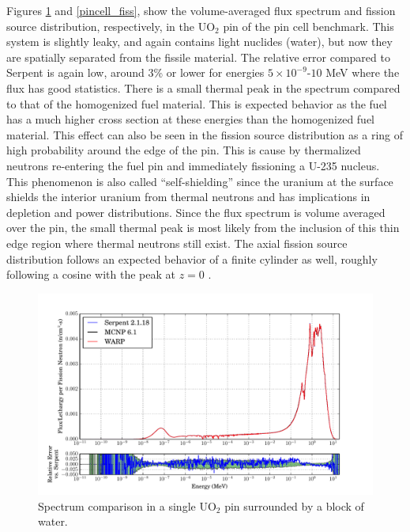 Figures \ref{pincell_spec} and \ref{pincell_fiss}, show the volume-averaged flux spectrum and fission source distribution, respectively, in the UO$_2$ pin of the pin cell benchmark.  This system is slightly leaky, and again contains light nuclides (water), but now they are spatially separated from the fissile material.  The relative error compared to Serpent is again low, around 3\% or lower for energies $5\times10^{-9}$-$10$ MeV where the flux has good statistics.  There is a small thermal peak in the spectrum compared to that of the homogenized fuel material.  This is expected behavior as the fuel has a much higher cross section at these energies than the homogenized fuel material.  This effect can also be seen in the fission source distribution as a ring of high probability around the edge of the pin.  This is cause by thermalized neutrons re-entering the fuel pin and immediately fissioning a U-235 nucleus.  This phenomenon is also called ``self-shielding'' since the uranium at the surface shields the interior uranium from thermal neutrons and has implications in depletion and power distributions.  Since the flux spectrum is volume averaged over the pin, the small thermal peak is most likely from the inclusion of this thin edge region where thermal neutrons still exist.  The axial fission source distribution follows an expected behavior of a finite cylinder as well, roughly following a cosine with the peak at $z=0$ \cite{duderstadt}.

 
\begin{figure}[h!] 
\centering
\includegraphics[width=\textwidth,trim= 1cm 0cm 1cm 0cm]{graphics/finalresults/pincell_spec-6.pdf}
\caption{Spectrum comparison in a single UO$_2$ pin surrounded by a block of water. \label{pincell_spec} }
\end{figure}

